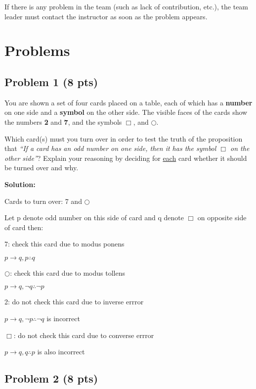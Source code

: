 \documentclass[12pt]{article}
\begin{document}
\noindent If there is any problem in the team (such as lack of contribution, etc.), the team leader must contact the instructor as soon as the problem appears.

\newpage

\section{Problems}

\subsection{Problem 1 (8 pts)}

\noindent You are shown a set of four cards placed on a table, each of which has a \textbf{number} on one side and a \textbf{symbol} on the other side. The visible faces of the cards show the numbers \textbf{2} and \textbf{7}, and the symbols \textbf{$\Box$}, and \textbf{$\bigcirc$}.

\bigskip
\noindent Which card(s) must you turn over in order to test the truth of the proposition that \textit{``If a card has an odd number on one side, then it has the symbol $\Box$ on the other side''}? Explain your reasoning by deciding for \underline{each} card whether it should be turned over and why.

\bigskip
\noindent \textbf{Solution:}

\noindent Cards to turn over: 7 and \textbf{$\bigcirc$}

\noindent Let p denote odd number on this side of card and q denote \textbf{$\Box$} on opposite side of card then:

7: check this card due to modus ponens

\indent \indent $p \rightarrow q, p \therefore q$

\textbf{$\bigcirc$}: check this card due to modus tollens

\indent \indent $p \rightarrow q, \neg q \therefore \neg p$

2: do not check this card due to inverse errror

\indent \indent $p \rightarrow q, \neg p \therefore \neg q$ is incorrect

\textbf{$\Box$}: do not check this card due to converse errror

\indent \indent $p \rightarrow q, q \therefore p$ is also incorrect

\newpage

\subsection{Problem 2 (8 pts)}
\end{document}

